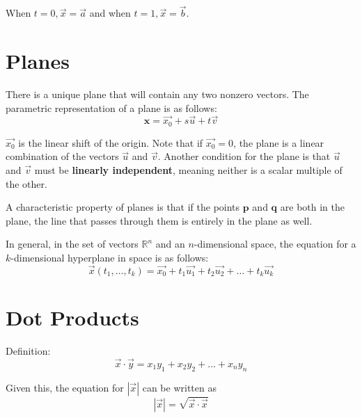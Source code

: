 \documentclass[11pt]{article}
\begin{document}
	When $t=0, \vec{x} = \vec{a}$ and when $t=1, \vec{x} = \vec{b}$.
	
\section{Planes}
	There is a unique plane that will contain any two nonzero vectors. The parametric representation of a plane is as follows:
	\begin{equation}
		\mathbf{x} = \vec{x_0} + s\vec{u} + t\vec{v}
	\end{equation}
	
	$\vec{x_0}$ is the linear shift of the origin. Note that if $\vec{x_0} = 0$, the plane is a linear combination of the vectors $\vec{u}$ and $\vec{v}$. Another condition for the plane is that $\vec{u}$ and $\vec{v}$ must be \textbf{linearly independent}, meaning neither is a scalar multiple of the other.
	
	A characteristic property of planes is that if the points $\mathbf{p}$ and $\mathbf{q}$ are both in the plane, the line that passes through them is entirely in the plane as well.
	
	In general, in the set of vectors $\mathbb{R}^n$ and an $n$-dimensional space, the equation for a $k$-dimensional hyperplane in space is as follows:
	\begin{equation}
		\vec{x}(t_1,\ldots ,t_k) = \vec{x_0} + t_1\vec{u_1} + t_2\vec{u_2} + \ldots + t_k\vec{u_k}
	\end{equation}
	
\section{Dot Products}
	Definition:
	\begin{equation}
		\vec{x} \cdot \vec{y} = x_1y_1 + x_2y_2 + \ldots + x_ny_n
	\end{equation}
	
	Given this, the equation for $|\vec{x}|$ can be written as
	\begin{equation}
		|\vec{x}| = \sqrt{\vec{x}\cdot\vec{x}}
	\end{equation}
	
\end{document}
